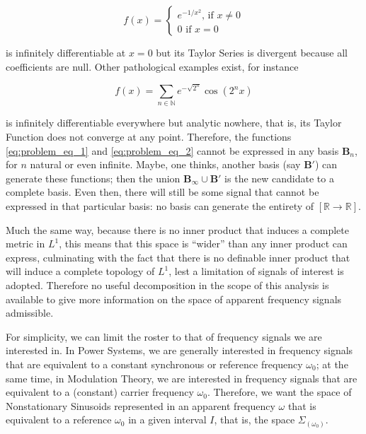 \begin{equation} f(x) = \left\{\begin{array}{l} e^{-1/x^2} \text{, if } x\neq 0\\[3mm] 0 \text{ if } x= 0\end{array}\right. \label{eq:problem_eq_1}\end{equation}

	\noindent is infinitely differentiable at $x=0$ but its Taylor Series is divergent because all coefficients are null. Other pathological examples exist, for instance

\begin{equation} f(x) = \sum_{n\in\mathbb{N}} e^{-\sqrt{2^n}} \cos\left(2^n x\right) \label{eq:problem_eq_2}\end{equation}

	\noindent is infinitely differentiable everywhere but analytic nowhere, that is, its Taylor Function does not converge at any point. Therefore, the functions \eqref{eq:problem_eq_1} and \eqref{eq:problem_eq_2} cannot be expressed in any basis $\mathbf{B}_n$, for $n$ natural or even infinite. Maybe, one thinks, another basis (say $\mathbf{B}'$) can generate these functions; then the union $\mathbf{B}_\infty\cup\mathbf{B}'$ is the new candidate to a complete basis. Even then, there will still be some signal that cannot be expressed in that particular basis: no basis can generate the entirety of $\left[\mathbb{R}\to\mathbb{R}\right]$.

	Much the same way, because there is no inner product that induces a complete metric in $L^1$, this means that this space is ``wider'' than any inner product can express, culminating with the fact that there is no definable inner product that will induce a complete topology of $L^1$, lest a limitation of signals of interest is adopted. Therefore no useful decomposition in the scope of this analysis is available to give more information on the space of apparent frequency signals admissible.

	For simplicity, we can limit the roster to that of frequency signals we are interested in. In Power Systems, we are generally interested in frequency signals that are equivalent to a constant synchronous or reference frequency $\omega_0$; at the same time, in Modulation Theory, we are interested in frequency signals that are equivalent to a (constant) carrier frequency $\omega_0$. Therefore, we want the space of Nonstationary Sinusoids represented in an apparent frequency $\omega$ that is equivalent to a reference $\omega_0$ in a given interval $I$, that is, the space $\Sigma_{\left(\omega_0\right)}$.

